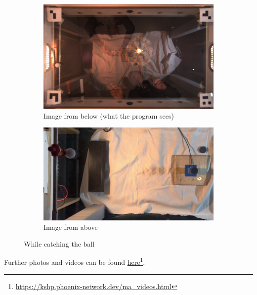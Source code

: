 \begin{figure}[H]
    \centering
    \begin{subfigure}{.5\textwidth}
        \centering
        \includegraphics[width=.9\textwidth]{../photos/player_catch_bottom}
        \caption{Image from below (what the program sees)}
        \label{fig:player_catch_bottom}
    \end{subfigure}%
    \begin{subfigure}{.5\textwidth}
        \centering
        \includegraphics[width=.9\textwidth]{../photos/catch_top}
        \caption{Image from above}
        \label{fig:before_top}
    \end{subfigure}
    \caption{While catching the ball}
    \label{fig:catch}
\end{figure}

Further photos and videos can be found \href{https://kshp.phoenix-network.dev/ma_videos.html}{here}\footnote{\url{https://kshp.phoenix-network.dev/ma_videos.html}}.